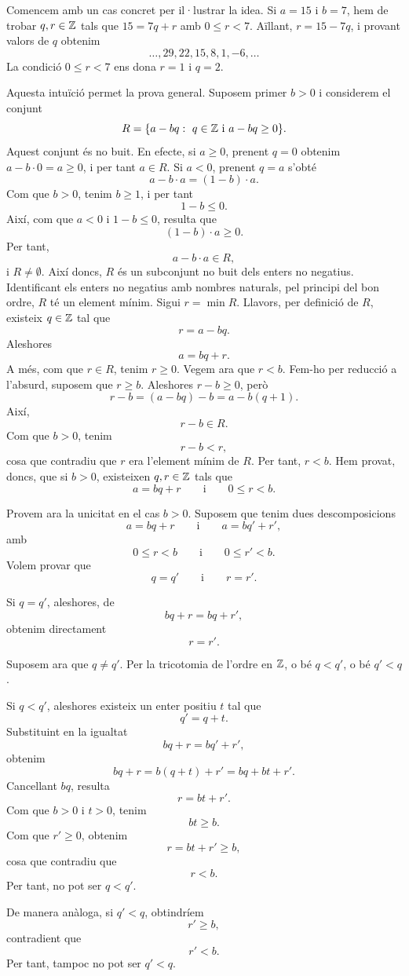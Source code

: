 \begin{prova}
Comencem amb un cas concret per il·lustrar la idea. Si $a=15$ i $b=7$, hem de trobar $q,r\in \mathbb{Z}$ tals que $15=7q+r$ amb $0\leq r<7$. Aïllant, $r=15-7q$, i provant valors de $q$ obtenim
\[
\ldots,29,22,15,8,1,-6,\ldots
\]
La condició $0\leq r<7$ ens dona $r=1$ i $q=2$.

Aquesta intuïció permet la prova general. Suposem primer $b>0$ i considerem el conjunt
\[
R=\{a-bq:\ q\in\mathbb{Z} \text{ i } a-bq\geq 0\}.
\]
Aquest conjunt és no buit. En efecte, si \(a\geq 0\), prenent \(q=0\) obtenim \(a-b\cdot0=a\geq0\), i per tant \(a\in R\). Si $a<0$, prenent $q=a$ s'obté
\[
a-b\cdot a=(1-b)\cdot a.
\]
Com que $b>0$, tenim $b\geq 1$, i per tant
\[
1-b\leq 0.
\]
Així, com que $a<0$ i $1-b\leq 0$, resulta que
\[
(1-b)\cdot a\geq 0.
\]
Per tant,
\[
a-b\cdot a\in R,
\] 
i $R\neq \emptyset$. Així doncs, $R$ és un subconjunt no buit dels enters no negatius. Identificant els enters no negatius amb nombres naturals, pel principi del bon ordre, $R$ té un element mínim. Sigui $r = \min R$. Llavors, per definició de $R$, existeix $q\in\mathbb{Z}$ tal que
\[
r=a-bq.
\]
Aleshores
\[
a=bq+r.
\]
A més, com que $r\in R$, tenim $r\geq 0$. Vegem ara que $r<b$. Fem-ho per reducció a l'absurd, suposem que $r\geq b$. Aleshores $r-b\geq 0$, però
\[
r-b=(a-bq)-b=a-b(q+1).
\]
Així,
\[
r-b\in R.
\]
Com que $b>0$, tenim
\[
r-b<r,
\]
cosa que contradiu que $r$ era l'element mínim de $R$. Per tant, $r<b$.
Hem provat, doncs, que si $b>0$, existeixen $q,r\in\mathbb{Z}$ tals que
\[
a=bq+r
\qquad\text{i}\qquad
0\leq r<b.
\]

Provem ara la unicitat en el cas $b>0$. Suposem que tenim dues descomposicions
\[
a=bq+r
\qquad\text{i}\qquad
a=bq'+r',
\]
amb
\[
0\leq r<b
\qquad\text{i}\qquad
0\leq r'<b.
\]
Volem provar que
\[
q=q'
\qquad\text{i}\qquad
r=r'.
\]

Si $q=q'$, aleshores, de
\[
bq+r=bq+r',
\]
obtenim directament
\[
r=r'.
\]

Suposem ara que $q\neq q'$. Per la tricotomia de l'ordre en $\mathbb{Z}$, o bé $q<q'$, o bé $q'<q$.

Si $q<q'$, aleshores existeix un enter positiu $t$ tal que
\[
q'=q+t.
\]
Substituint en la igualtat
\[
bq+r=bq'+r',
\]
obtenim
\[
bq+r=b(q+t)+r'=bq+bt+r'.
\]
Cancel\textperiodcentered{}lant $bq$, resulta
\[
r=bt+r'.
\]
Com que $b>0$ i $t>0$, tenim
\[
bt\geq b.
\]
Com que $r'\geq 0$, obtenim
\[
r=bt+r'\geq b,
\]
cosa que contradiu que
\[
r<b.
\]
Per tant, no pot ser $q<q'$.

De manera anàloga, si $q'<q$, obtindríem
\[
r'\geq b,
\]
contradient que
\[
r'<b.
\]
Per tant, tampoc no pot ser $q'<q$.


\end{prova}
